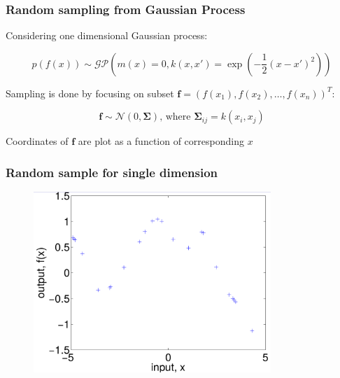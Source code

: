 \documentclass[10pt]{beamer}
\newcommand{\boldf}{\mathbf{f}}
\newcommand{\gp}{\mathcal{GP}}
\newcommand{\gaussN}{\mathcal{N}}
\newcommand{\bSig}{\boldsymbol{\Sigma}}
\begin{document}
  \begin{frame}
    \frametitle{Random sampling from Gaussian Process}
    Considering one dimensional Gaussian process:

    \begin{equation*}
      p(f(x)) \sim \gp \left( m(x) = 0, k(x,x') = \exp \left( - \frac{1}{2} (x - x')^2 \right) \right)
    \end{equation*}

    \pause

    Sampling is done by focusing on subset $\boldf = (f(x_1), f(x_2),\dots,f(x_n))^T$:

    \begin{equation*}
      \boldf \sim \gaussN(0,\bSig) \text{, where } \bSig_{ij} = k(x_i,x_j)
    \end{equation*}

    Coordinates of $\boldf$ are plot as a function of corresponding $x$
  \end{frame}

  \begin{frame}
    \frametitle{Random sample for single dimension}

    \begin{figure}
      \centering
      \includegraphics[width=0.8\textwidth]{gpSample.png}
    \end{figure}
  \end{frame}
\end{document}
